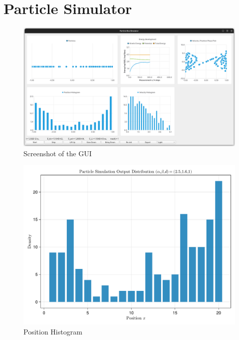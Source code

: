 \chapter{Particle Simulator}
\label{chap:particle-simulator}




\begin{figure}[H]
  \centering
  \label{fig:gui-screenshot}
  \includegraphics[width=\linewidth]{../figures/gui-screenshot.png}
  \caption{Screenshot of the GUI}
\end{figure}

\begin{figure}[H]
  \centering
  \label{fig:simulation-histogram}
  \includegraphics[width=0.8\linewidth]{../figures/results/simulation-histogram.pdf}
  \caption{Position Histogram}
\end{figure}
